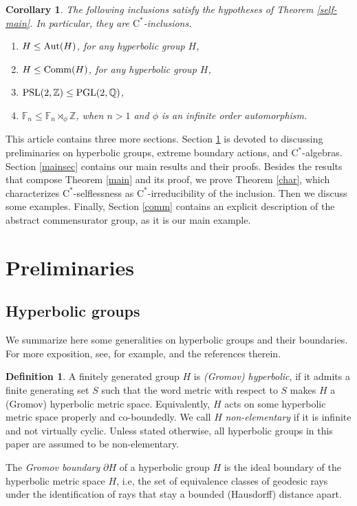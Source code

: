 \documentclass[11pt]{article}
\newtheorem{cor}[thm]{Corollary}
\theoremstyle{definition}
\newtheorem{defn}[thm]{Definition}
\theoremstyle{remark}
\numberwithin{equation}{section}
\numberwithin{equation}{section}
\newcommand{\Q}{\mathbb{Q}}
\def\Z{\mathbb{Z}}
\def\Z{\mathbb Z}
\newcommand{\Cs}{\ensuremath{\mathrm{C}^\ast}}
\numberwithin{equation}{section}
\begin{document}
\begin{cor}\label{main-cor}
    The following inclusions satisfy the hypotheses of Theorem \ref{self-main}. In particular, they are \Cs-inclusions.
    \begin{enumerate}
        \item $H\leq {\rm Aut}(H)$, for any hyperbolic group $H$,
        \item $H\leq {\rm Comm}(H)$, for any hyperbolic group $H$,
        \item ${\rm PSL}(2,\Z)\leq{\rm PGL}(2,\Q)$,
        \item $\mathbb F_n\leq\mathbb F_n\rtimes_\phi \Z$, when $n>1$ and $\phi$ is an infinite order automorphism.
    \end{enumerate}
\end{cor}

This article contains three more sections. Section \ref{prelims} is devoted to discussing preliminaries on hyperbolic groups, extreme boundary actions, and \Cs-algebras. Section \ref{mainsec} contains our main results and their proofs. Besides the results that compose Theorem \ref{main} and its proof, we prove Theorem \ref{char}, which characterizes \Cs-selflessness as \Cs-irreducibility of the inclusion. Then we discuss some examples. Finally, Section \ref{comm} contains an explicit description of the abstract commensurator group, as it is our main example.



\section{Preliminaries}\label{prelims}



\subsection{Hyperbolic groups}

We summarize here some generalities on hyperbolic groups and their boundaries. For more exposition, see, for example, \cite[Section V.D]{dlH00} and the references therein.
\begin{defn}
   A finitely generated group \( H \) is \textit{(Gromov) hyperbolic}, if it admits a finite generating set \( S \) such that the word metric with respect to \( S \) makes \( H \) a (Gromov) hyperbolic metric space. Equivalently, \( H \) acts on some hyperbolic metric space properly and co-boundedly. We call \( H \) \textit{non-elementary} if it is infinite and not virtually cyclic. Unless stated otherwise, all hyperbolic groups in this paper are assumed to be non-elementary.
   \smallskip{}

   The \textit{Gromov boundary} \( \partial H \) of a hyperbolic group \( H \) is the ideal boundary of the hyperbolic metric space \( H \), i.e, the set of equivalence classes of geodesic rays under the identification of rays that stay a bounded (Hausdorff) distance apart.
\end{defn}
\end{document}
